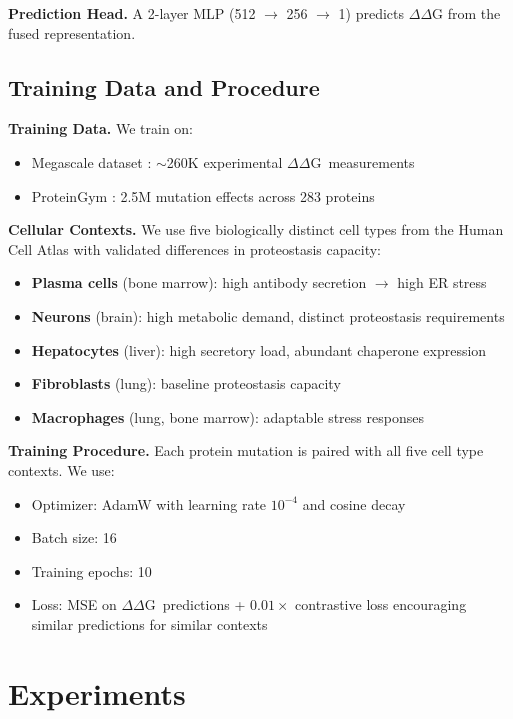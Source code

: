 \documentclass{article}
\newcommand{\ddg}{$\Delta\Delta$G}
\begin{document}
\textbf{Prediction Head.} A 2-layer MLP (512 $\rightarrow$ 256 $\rightarrow$ 1) predicts $\Delta\Delta$G from the fused representation.

\subsection{Training Data and Procedure}

\textbf{Training Data.} We train on:
\begin{itemize}
    \item Megascale dataset \citep{rocklin2023megascale}: $\sim$260K experimental \ddg\ measurements
    \item ProteinGym \citep{notin2023proteingym}: 2.5M mutation effects across 283 proteins
\end{itemize}

\textbf{Cellular Contexts.} We use five biologically distinct cell types from the Human Cell Atlas with validated differences in proteostasis capacity:
\begin{itemize}
    \item \textbf{Plasma cells} (bone marrow): high antibody secretion $\rightarrow$ high ER stress
    \item \textbf{Neurons} (brain): high metabolic demand, distinct proteostasis requirements
    \item \textbf{Hepatocytes} (liver): high secretory load, abundant chaperone expression
    \item \textbf{Fibroblasts} (lung): baseline proteostasis capacity
    \item \textbf{Macrophages} (lung, bone marrow): adaptable stress responses
\end{itemize}

\textbf{Training Procedure.} Each protein mutation is paired with all five cell type contexts. We use:
\begin{itemize}
    \item Optimizer: AdamW with learning rate $10^{-4}$ and cosine decay
    \item Batch size: 16
    \item Training epochs: 10
    \item Loss: MSE on \ddg\ predictions + $0.01 \times$ contrastive loss encouraging similar predictions for similar contexts
\end{itemize}

\section{Experiments}
\label{sec:experiments}
\end{document}
